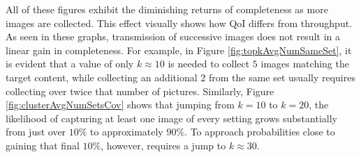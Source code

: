 All of these figures exhibit the diminishing returns of completeness as more images are collected.  This effect visually shows how QoI differs from throughput.  As seen in these graphs, transmission of successive images does not result in a linear gain in completeness.  For example, in Figure \ref{fig:topkAvgNumSameSet}, it is evident that a value of only $k \approx 10$ is needed to collect $5$ images matching the target content, while collecting an additional $2$ from the same set usually requires collecting over twice that number of pictures.  
Similarly, Figure \ref{fig:clusterAvgNumSetsCov} shows that jumping from $k=10$ to $k=20$, the likelihood of capturing at least one image of every setting grows substantially from just over $10\%$ to approximately $90\%$.  To approach probabilities close to gaining that final $10\%$, however, requires a jump to $k\approx30$.  


%
%



